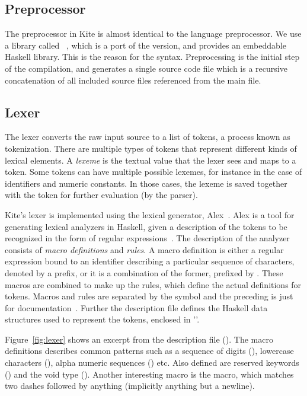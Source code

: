 
\subsection{Preprocessor}
The preprocessor in Kite is almost identical to the  language preprocessor. We use a library called ~\cite{wallace04}, which is a port of the  version, and provides an embeddable Haskell library. This is the reason for the  syntax. Preprocessing is the initial step of the compilation, and generates a single source code file which is a recursive concatenation of all included source files referenced from the main file.


\subsection{Lexer}
\label{sec:impl-lexer}
The lexer converts the raw input source to a list of tokens, a process known as tokenization. There are multiple types of tokens that represent different kinds of lexical elements. A \emph{lexeme} is the textual value that the lexer sees and maps to a token. Some tokens can have multiple possible lexemes, for instance in the case of identifiers and numeric constants. In those cases, the lexeme is saved together with the token for further evaluation (by the parser).

Kite's lexer is implemented using the lexical generator, Alex~\cite{dornan01}. Alex is a tool for generating lexical analyzers in Haskell, given a description of the tokens to be recognized in the form of regular expressions~\cite[p. 4]{dornan01}. The description of the analyzer consists of \emph{macro definitions} and \emph{rules}. A macro definition is either a regular expression bound to an identifier describing a particular sequence of characters, denoted by a \code{\$} prefix, or it is a combination of the former, prefixed by . These macros are combined to make up the rules, which define the actual definitions for tokens. Macros and rules are separated by the symbol \code{:-} and the preceding  is just for documentation~\cite[p. 7]{dornan01}. Further the description file defines the Haskell data structures used to represent the tokens, enclosed in '\code{\{ \}}'.

Figure~\ref{fig:lexer} shows an excerpt from the description file (). The macro definitions describes common patterns such as a sequence of digits (), lowercase characters (), alpha numeric sequences () etc. Also defined are reserved keywords (\code{\@keywords}) and the void type (). Another interesting macro is the  macro, which matches two dashes followed by anything (implicitly anything but a newline).

